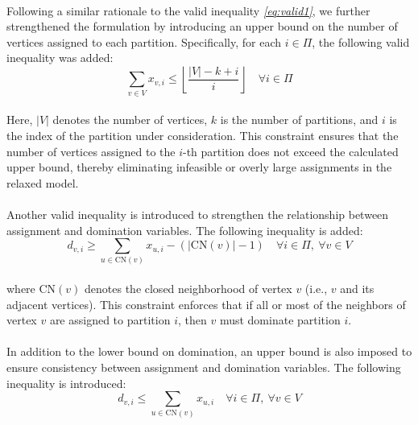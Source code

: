 \paragraph{} Following a similar rationale to the valid inequality \textsl{\eqref{eq:valid1}}, we further strengthened the formulation by introducing an upper bound on the number of vertices assigned to each partition. Specifically, for each $i \in \Pi$, the following valid inequality was added:
\begin{equation}
    \sum_{v \in V} x_{v,i} \leq \left\lfloor \frac{|V| - k + i}{i} \right\rfloor \quad \forall i \in \Pi \label{eq:valid2}
\end{equation}

\paragraph{} Here, $|V|$ denotes the number of vertices, $k$ is the number of partitions, and $i$ is the index of the partition under consideration. This constraint ensures that the number of vertices assigned to the $i$-th partition does not exceed the calculated upper bound, thereby eliminating infeasible or overly large assignments in the relaxed model.

\paragraph{} Another valid inequality is introduced to strengthen the relationship between assignment and domination variables. The following inequality is added:
\begin{equation}
    d_{v,i} \geq \sum_{u \in \text{CN}(v)} x_{u,i} - \left( |\text{CN}(v)| - 1 \right) \quad \forall i \in \Pi,\ \forall v \in V
\end{equation}

\paragraph{} where $\text{CN}(v)$ denotes the closed neighborhood of vertex $v$ (i.e., $v$ and its adjacent vertices). This constraint enforces that if all or most of the neighbors of vertex $v$ are assigned to partition $i$, then $v$ must dominate partition $i$.

\paragraph{} In addition to the lower bound on domination, an upper bound is also imposed to ensure consistency between assignment and domination variables. The following inequality is introduced:
\begin{equation}
    d_{v,i} \leq \sum_{u \in \text{CN}(v)} x_{u,i}  \quad \forall i \in \Pi,\ \forall v \in V
\end{equation}

